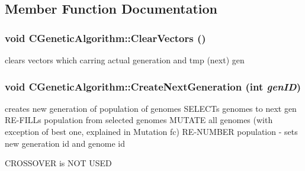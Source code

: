 \subsection{Member Function Documentation}
\hypertarget{classCGeneticAlgorithm_a8b027efefd585c7c3b0cdbffeebc2705}{
\subsubsection[{ClearVectors}]{\setlength{\rightskip}{0pt plus 5cm}void CGeneticAlgorithm::ClearVectors ()}}
\label{classCGeneticAlgorithm_a8b027efefd585c7c3b0cdbffeebc2705}
clears vectors which carring actual generation and tmp (next) gen \hypertarget{classCGeneticAlgorithm_a790cc40ce38ec37681cf5f5a7c169915}{
\subsubsection[{CreateNextGeneration}]{\setlength{\rightskip}{0pt plus 5cm}void CGeneticAlgorithm::CreateNextGeneration (int {\em genID})}}
\label{classCGeneticAlgorithm_a790cc40ce38ec37681cf5f5a7c169915}
creates new generation of population of genomes SELECTs genomes to next gen RE-\/FILLs population from selected genomes MUTATE all genomes (with exception of best one, explained in Mutation fc) RE-\/NUMBER population -\/ sets new generation id and genome id

CROSSOVER is NOT USED


